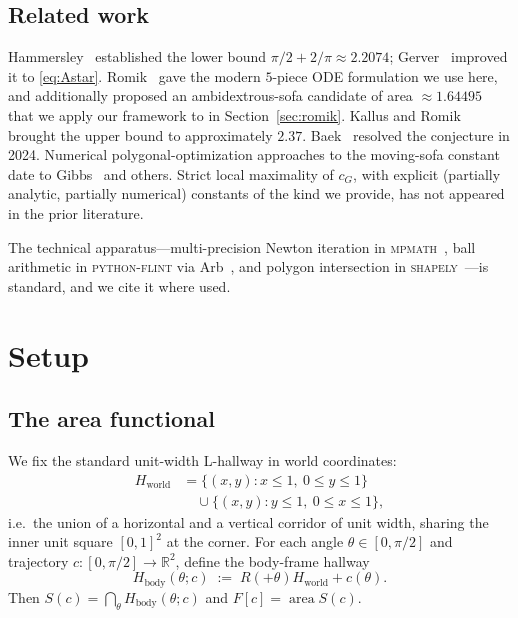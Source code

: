 \documentclass[11pt]{amsart}
\theoremstyle{plain}
\theoremstyle{definition}
\newcommand{\R}{\mathbb{R}}
\newcommand{\cG}{c_{G}}
\newcommand{\Hbody}{H_{\mathrm{body}}}
\newcommand{\Hworld}{H_{\mathrm{world}}}
\DeclareMathOperator{\area}{area}
\begin{document}
\subsection*{Related work}

Hammersley~\cite{Hammersley1968} established the lower bound $\pi/2 +
2/\pi \approx 2.2074$; Gerver~\cite{Gerver1992} improved it to
\eqref{eq:Astar}.  Romik~\cite{Romik2018} gave the modern
$5$-piece ODE formulation we use here, and additionally proposed an
ambidextrous-sofa candidate of area $\approx 1.64495$ that we apply
our framework to in Section~\ref{sec:romik}.  Kallus and
Romik~\cite{KallusRomik2018} brought the upper bound to approximately
$2.37$.  Baek~\cite{Baek2024} resolved the conjecture in 2024.  Numerical
polygonal-optimization approaches to the moving-sofa constant date
to Gibbs~\cite{Gibbs2014} and others.  Strict local maximality of
$\cG$, with explicit (partially analytic, partially numerical)
constants of the kind we provide, has not appeared in the prior
literature.

The technical apparatus---multi-precision Newton iteration in
\textsc{mpmath}~\cite{mpmath}, ball arithmetic in
\textsc{python-flint} via Arb~\cite{arb}, and polygon intersection in
\textsc{shapely}~\cite{shapely}---is
standard, and we cite it where used.

\section{Setup}\label{sec:setup}

\subsection{The area functional}
We fix the standard unit-width L-hallway in world coordinates:
\begin{align}
  \Hworld &= \bigl\{(x, y) : x \leq 1,\ 0 \leq y \leq 1\bigr\} \\
          &\quad \cup \bigl\{(x, y) : y \leq 1,\ 0 \leq x \leq 1\bigr\},
\end{align}
i.e.~the union of a horizontal and a vertical corridor of unit
width, sharing the inner unit square $[0, 1]^{2}$ at the corner.
For each angle $\theta \in [0, \pi/2]$ and trajectory $c : [0, \pi/2]
\to \R^{2}$, define the body-frame hallway
\begin{equation}
  \Hbody(\theta; c) \;:=\; R(+\theta) \Hworld + c(\theta).
\end{equation}
Then $S(c) = \bigcap_{\theta} \Hbody(\theta; c)$ and $F[c] = \area
S(c)$.
\end{document}
